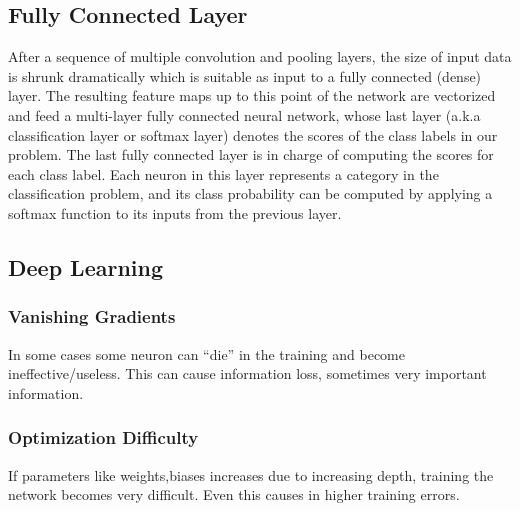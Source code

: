 \documentclass[12pt]{article}
\numberwithin{equation}{section}
\numberwithin{table}{section}
\numberwithin{figure}{section}
\begin{document}
\subsection{Fully Connected Layer}
After a sequence of multiple convolution and pooling layers, the size of input
data is shrunk dramatically which is suitable as input to a fully connected
(dense) layer. The resulting feature maps up to this point of the network
are vectorized and feed a multi-layer fully connected neural network, whose
last layer (a.k.a classification layer or softmax layer) denotes the scores of
the class labels in our problem.
The last fully connected layer is in charge of computing the scores for each class label. Each neuron in this layer represents a category in the
classification problem, and its class probability can be computed by applying
a softmax function to its inputs from the previous layer.





















\subsection{Deep Learning}






\subsubsection{ Vanishing Gradients }

In some cases some neuron can “die” in the training and become ineffective/useless. This can cause information loss, sometimes very important information.

\subsubsection{ Optimization Difficulty }

If parameters like weights,biases increases due to increasing depth, training the network becomes very difficult. Even this causes in higher training errors.
\end{document}
